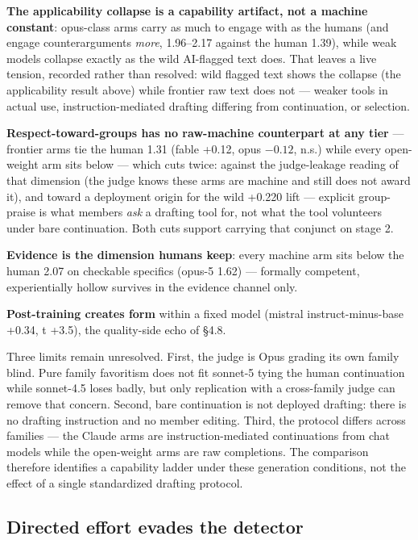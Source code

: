 \textbf{The applicability collapse is a capability artifact, not a machine
constant}: opus-class arms carry as much to engage with as the humans (and
engage counterarguments \emph{more}, 1.96--2.17 against the human 1.39), while weak
models collapse exactly as the wild AI-flagged text does. That leaves a live
tension, recorded rather than resolved: wild flagged text shows the collapse
(the applicability result above) while frontier raw text does not --- weaker
tools in actual use, instruction-mediated drafting differing from
continuation, or selection.

\textbf{Respect-toward-groups has no raw-machine counterpart at any tier} ---
frontier arms tie the human 1.31 (fable +0.12, opus \(-0.12\), n.s.) while every
open-weight arm sits below --- which cuts twice: against the judge-leakage
reading of that dimension (the judge knows these arms are machine and still
does not award it), and toward a deployment origin for the wild +0.220 lift ---
explicit group-praise is what members \emph{ask} a drafting tool for, not what the
tool volunteers under bare continuation. Both cuts support carrying that
conjunct on stage 2.

\textbf{Evidence is the dimension humans keep}: every machine arm sits below the
human 2.07 on checkable specifics (opus-5 1.62) --- formally competent,
experientially hollow survives in the evidence channel only.

\textbf{Post-training creates form} within a fixed model (mistral instruct-minus-base
+0.34, t +3.5), the quality-side echo of §4.8.

Three limits remain unresolved. First, the judge is Opus grading its own
family blind. Pure family favoritism does not fit sonnet-5 tying the human
continuation while sonnet-4.5 loses badly, but only replication with a
cross-family judge can remove that concern. Second, bare continuation is not
deployed drafting: there is no drafting instruction and no member editing.
Third, the protocol differs across families --- the Claude arms are
instruction-mediated continuations from chat models while the open-weight arms
are raw completions. The comparison therefore identifies a capability ladder
under these generation conditions, not the effect of a single standardized
drafting protocol.

\subsection{Directed effort evades the detector}\label{sec:evasion}

